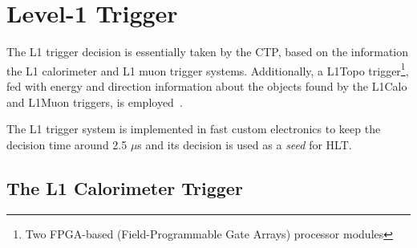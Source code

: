 

		
	\section{Level-1 Trigger}
	\label{sec:L1}

		The \ac{L1} trigger decision is essentially taken by the \ac{CTP}, based on the information the \ac{L1} calorimeter and \ac{L1} muon trigger systems. Additionally, a \ac{L1Topo} trigger\footnote{Two FPGA-based (Field-Programmable Gate Arrays) processor modules}, fed with energy and direction information about the objects found by the \ac{L1Calo} and \ac{L1Muon} triggers, is employed~\cite{ATLASJINST,ATLASTrigger2015,ATLASL1Topo}.

		The \ac{L1} trigger system is implemented in fast custom electronics to keep the decision time around 2.5 $\mu$s and its decision is used as a \emph{seed} for \ac{HLT}. 


		\subsection*{The L1 Calorimeter Trigger}

